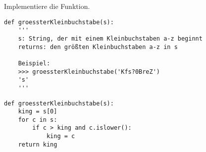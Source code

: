 \question[4]  Implementiere die Funktion.

\begin{lstlisting}
def groessterKleinbuchstabe(s):
    '''
    s: String, der mit einem Kleinbuchstaben a-z beginnt
    returns: den größten Kleinbuchstaben a-z in s

    Beispiel:
    >>> groessterKleinbuchstabe('Kfs?0BreZ')
    's'
    '''
\end{lstlisting}
\begin{solutionbox}{10cm}
\begin{lstlisting}
def groessterKleinbuchstabe(s):
    king = s[0]
    for c in s:
        if c > king and c.islower():
            king = c
    return king
\end{lstlisting}
\end{solutionbox}
